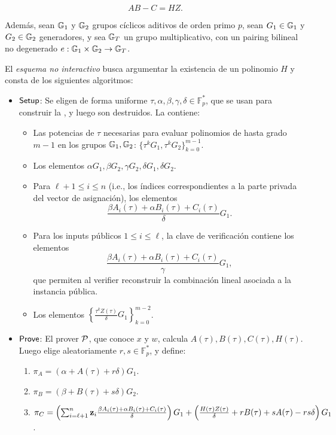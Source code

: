 $$AB - C = HZ.$$

Además, sean $\mathbb{G}_1$ y $\mathbb{G}_2$ grupos cíclicos aditivos de orden primo $p$, sean $G_1 \in \mathbb{G}_1$ y $G_2 \in \mathbb{G}_2$ generadores, y sea $\mathbb{G}_T$ un grupo multiplicativo, con un pairing bilineal no degenerado $e: \mathbb{G}_1 \times \mathbb{G}_2 \to \mathbb{G}_T$.

\begin{definition}
\label{def:apendice-b-groth16-esquema-no-interactivo-groth}
	El \emph{esquema no interactivo \Groth} busca argumentar la existencia de un polinomio $H$ y consta de los siguientes algoritmos:
	
	\begin{itemize}
		\item $\mathsf{Setup}$: Se eligen de forma uniforme $\tau, \alpha, \beta, \gamma, \delta \in \mathbb{F}^*_p$, que se usan para construir la \SRS, y luego son destruidos. La \SRS contiene:
		\begin{itemize}[noitemsep]
			\item Las potencias de $\tau$ necesarias para evaluar polinomios de hasta grado $m - 1$ en los grupos $\mathbb{G}_1, \mathbb{G}_2$: $\{\tau^k G_1, \tau^k G_2\}_{k=0}^{m-1}$.
			\item Los elementos $\alpha G_1, \beta G_2, \gamma G_2, \delta G_1, \delta G_2$.
			\item Para $\ell + 1 \leq i \leq n$ (i.e., los índices correspondientes a la parte privada del vector de asignación), los elementos
			$$\frac{\beta A_i(\tau) + \alpha B_i(\tau) + C_i(\tau)}{\delta} G_1.$$
			\item Para los inputs públicos $1 \leq i \leq \ell$, la clave de verificación contiene los elementos
			$$\frac{\beta A_i(\tau) + \alpha B_i(\tau) + C_i(\tau)}{\gamma} G_1,$$
			que permiten al verifier reconstruir la combinación lineal asociada a la instancia pública.
			\item Los elementos $\left\{\frac{\tau^k Z(\tau)}{\delta} G_1\right\}_{k=0}^{m-2}$.
		\end{itemize}
		\item $\mathsf{Prove}$: El prover $\mathcal{P}$, que conoce $x$ y $w$, calcula $A(\tau), B(\tau), C(\tau), H(\tau)$. Luego elige aleatoriamente $r, s \in \mathbb{F}^*_p$, y define:
		\begin{enumerate}
			\item $\pi_A = \left(\alpha + A(\tau) + r\delta\right) G_1$.
			\item $\pi_B = \left(\beta + B(\tau) + s\delta\right) G_2$.
			\item $\pi_C = \left(\sum_{i=\ell+1}^{n} \mathbf{z}_i \frac{\beta A_i(\tau) + \alpha B_i(\tau) + C_i(\tau)}{\delta}\right)G_1 + \left(\frac{H(\tau)Z(\tau)}{\delta} + rB(\tau) + sA(\tau) - rs\delta\right)G_1 $.

\end{enumerate}
\end{itemize}
\end{definition}
